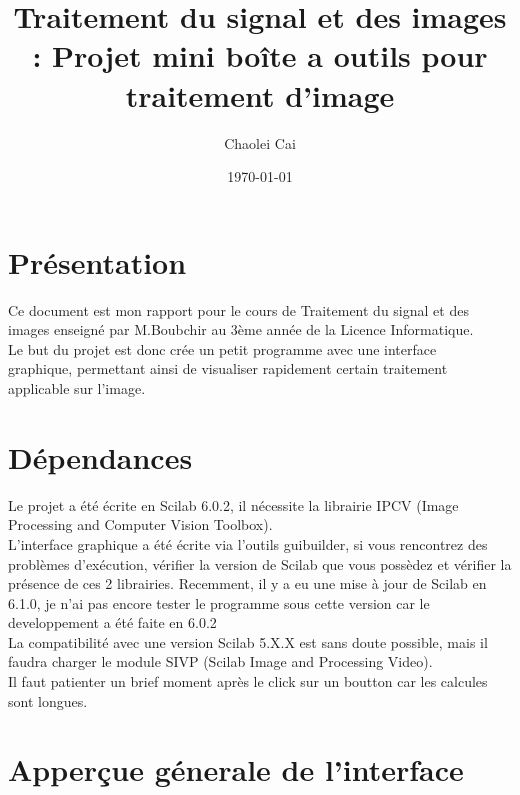 \documentclass[12pt, letterpaper]{article}
\title{Traitement du signal et des images : Projet mini boîte a outils pour traitement d'image}
\author{Chaolei Cai
\\
    \multicolumn{1}{
        p{.7\textwidth}}{\centering\emph{Université Paris Vincennes St-Denis\\
  UFR mathématiques, informatique, technologies sciences de l'information\\}
  L3 Informatique}
}
\date{\today}
\begin{document}
 
\begin{titlepage}
    \maketitle
\end{titlepage}

\tableofcontents

\section{Présentation}
Ce document est mon rapport pour le cours de Traitement du signal et des images enseigné par M.Boubchir au 3ème année de 
la Licence Informatique.\\
Le but du projet est donc crée un petit programme avec une interface \\graphique, permettant ainsi de 
visualiser rapidement certain traitement applicable sur l'image.\\


\section{Dépendances}
Le projet a été écrite en Scilab 6.0.2, il nécessite la librairie IPCV (Image Processing and Computer Vision Toolbox).\\
L'interface graphique a été écrite via l'outils guibuilder, si vous rencontrez des problèmes d'exécution, vérifier la version de Scilab 
que vous possèdez et vérifier la présence de ces 2 librairies. Recemment, il y a eu une mise à jour de Scilab en 6.1.0, je n'ai 
pas encore tester le programme sous cette version car le developpement a été faite en 6.0.2\\
La compatibilité avec une version Scilab 5.X.X est sans doute possible, mais il faudra charger le module 
SIVP (Scilab Image and Processing Video).\\
Il faut patienter un brief moment après le click sur un boutton car les calcules sont longues.


\section{Apperçue génerale de l'interface}
\end{document}
